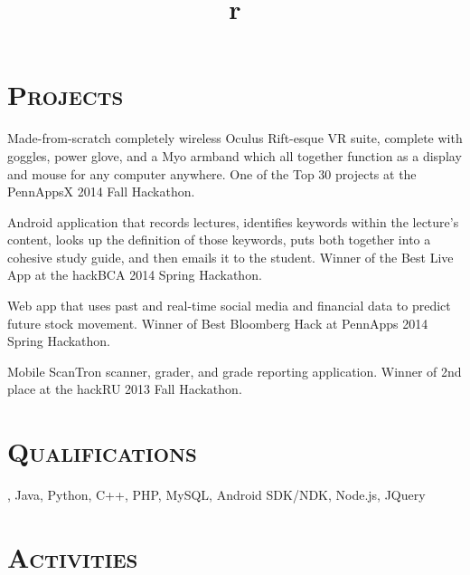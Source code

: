 \begin{resume}
\section{\textsc{Projects}}

\begin{position}
Made-from-scratch completely wireless Oculus Rift-esque VR suite, complete with goggles, power glove, and a Myo armband which all together function as a display and mouse for any computer anywhere. One of the Top 30 projects at the PennAppsX 2014 Fall Hackathon.
\end{position}

\begin{position}
Android application that records lectures, identifies keywords within the lecture's content, looks up the definition of those keywords, puts both together into a cohesive study guide, and then emails it to the student. Winner of the Best Live App at the hackBCA 2014 Spring Hackathon. 
\end{position}

\begin{position}
Web app that uses past and real-time social media and financial data to predict future stock movement. Winner of Best Bloomberg Hack at PennApps 2014 Spring Hackathon.
\end{position}

\begin{position}
Mobile ScanTron scanner, grader, and grade reporting application. Winner of 2nd place at the hackRU 2013 Fall Hackathon.
\end{position}

\section{\textsc{Qualifications}}
\Cplusplus, Java, Python, C++, PHP, MySQL, Android SDK/NDK, Node.js, JQuery
\section{\textsc{Activities}}

\begin{formatb}
  \title{r}\\
  \body\\
\end{formatb}


\end{resume}
